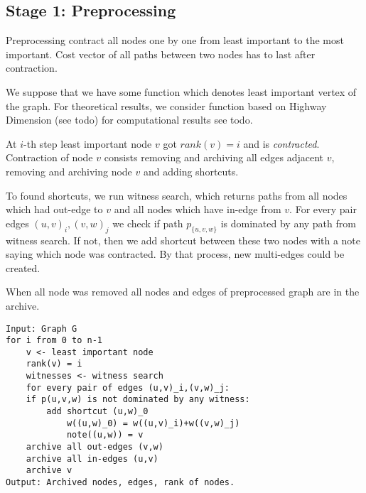 

\subsection{Stage 1: Preprocessing}

Preprocessing contract all nodes one by one from least important to the most important. 
Cost vector of all paths between two nodes has to last after contraction.

We suppose that we have some function which denotes least important vertex of the graph. For theoretical results, we consider function based on Highway Dimension
(see todo)  for computational results see todo.

At $i$-th step least important node $v$ got $rank(v) = i$ and is \emph{contracted}. 
Contraction of node $v$ consists removing and archiving all edges adjacent $v$, removing 
and archiving node $v$ and adding shortcuts. 

To found shortcuts, we run witness search, which returns paths from all nodes which had
out-edge to $v$ and all nodes which have in-edge from $v$. 
For every pair edges $(u,v)_i,(v,w)_j$ we check 
if path $p_{\{u,v,w\}}$ is dominated by any path from witness search. 
If not, then we add shortcut between these two nodes with a note 
saying which node was contracted.
By that process, new multi-edges could be created.

When all node was removed all nodes and edges of preprocessed graph are in the archive.

\begin{lstlisting}[caption={MCHp},label=list:8-6,captionpos=t,float,abovecaptionskip=-\medskipamount]
Input: Graph G
for i from 0 to n-1
    v <- least important node
    rank(v) = i
    witnesses <- witness search
    for every pair of edges (u,v)_i,(v,w)_j:
    if p(u,v,w) is not dominated by any witness:
        add shortcut (u,w)_0
            w((u,w)_0) = w((u,v)_i)+w((v,w)_j)
            note((u,w)) = v
    archive all out-edges (v,w) 
    archive all in-edges (u,v)
    archive v
Output: Archived nodes, edges, rank of nodes.
\end{lstlisting}


